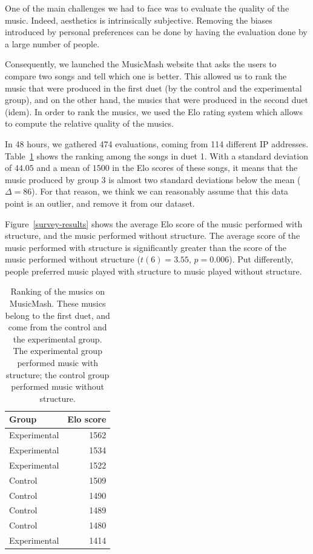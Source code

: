 \documentclass{article}
\begin{document}
One of the main challenges we had to face was to evaluate the quality of the music. Indeed, aesthetics is intrinsically subjective. Removing the biases introduced by personal preferences can be done by having the evaluation done by a large number of people.

Consequently, we launched the MusicMash website that asks the users to compare two songs and tell which one is better. This allowed us to rank the music that were produced in the first duet (by the control and the experimental group), and on the other hand, the musics that were produced in the second duet (idem). In order to rank the musics, we used the Elo rating system which allows to compute the relative quality of the musics.

In 48 hours, we gathered 474 evaluations, coming from 114 different IP addresses. Table~\ref{musicmash-results} shows the ranking among the songs in duet 1. With a standard deviation of $44.05$ and a mean of $1500$ in the Elo scores of these songs, it means that the music produced by group 3 is almost two standard deviations below the mean ($\Delta = 86$). For that reason, we think we can reasonably assume that this data point is an outlier, and remove it from our dataset.

Figure~\ref{survey-results} shows the average Elo score of the music performed with structure, and the music performed without structure. The average score of the music performed with structure is significantly greater than the score of the music performed without structure ($t(6) = 3.55$, $p = 0.006$). Put differently, people preferred music played with structure to music played without structure.

\begin{table}[tb]
\begin{center}
\begin{tabular}{l r}
Group & Elo score \\
\hline
Experimental & 1562 \\
Experimental & 1534 \\
Experimental & 1522 \\
Control & 1509 \\
Control & 1490 \\
Control & 1489 \\
Control & 1480 \\
Experimental & 1414 \\
\end{tabular}
\caption{Ranking of the musics on MusicMash. These musics belong to the first duet, and come from the control and the experimental group. The experimental group performed music with structure; the control group performed music without structure.} 
\label{musicmash-results}
\end{center}
\end{table}
\end{document}
